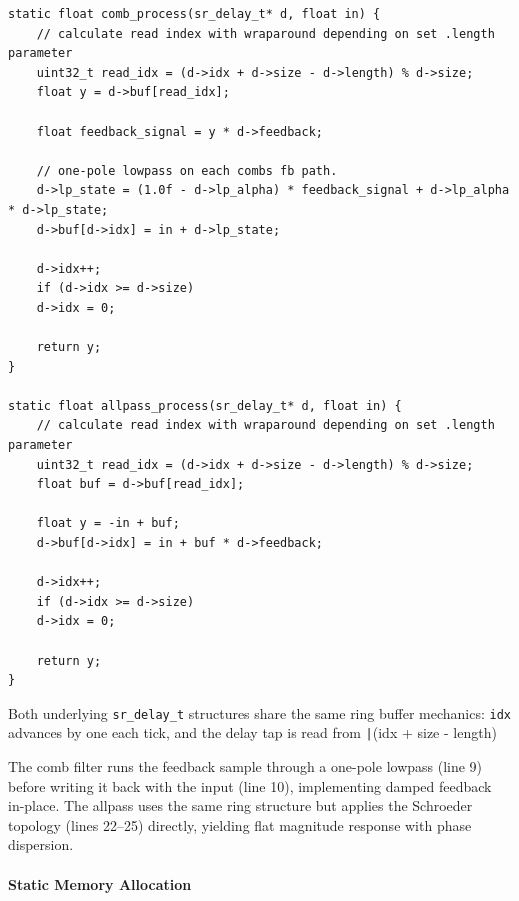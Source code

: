 \begin{listing}[H]
\vspace{-2.5mm}	
\begin{verbatim}
static float comb_process(sr_delay_t* d, float in) {
	// calculate read index with wraparound depending on set .length parameter
	uint32_t read_idx = (d->idx + d->size - d->length) % d->size;
	float y = d->buf[read_idx];
	
	float feedback_signal = y * d->feedback;
	
	// one-pole lowpass on each combs fb path.
	d->lp_state = (1.0f - d->lp_alpha) * feedback_signal + d->lp_alpha * d->lp_state;
	d->buf[d->idx] = in + d->lp_state;
	
	d->idx++;
	if (d->idx >= d->size)
	d->idx = 0;
	
	return y;
}

static float allpass_process(sr_delay_t* d, float in) {
	// calculate read index with wraparound depending on set .length parameter
	uint32_t read_idx = (d->idx + d->size - d->length) % d->size;
	float buf = d->buf[read_idx];
	
	float y = -in + buf;
	d->buf[d->idx] = in + buf * d->feedback;
	
	d->idx++;
	if (d->idx >= d->size)
	d->idx = 0;
	
	return y;
}
\end{verbatim}
\vspace{-2.0em}
\caption{process functions of comb and allpass filters}
\label{lst:schroeder-process-functions}
\end{listing}


Both underlying \texttt{sr\_delay\_t} structures share the same ring buffer mechanics: \texttt{idx} advances by one each tick, and the delay tap is read from \texttt|(idx + size - length) %

The comb filter runs the feedback sample through a one-pole lowpass (line 9) before writing it back with the input (line 10), implementing damped feedback in-place. 
The allpass uses the same ring structure but applies the Schroeder topology (lines 22--25) directly, yielding flat magnitude response with phase dispersion.

\paragraph{Static Memory Allocation} 
\label{sec:schroeder_memory_allocation}

